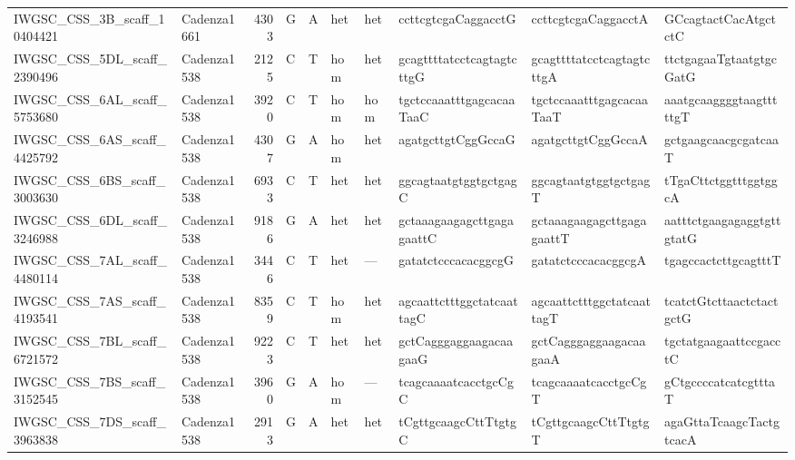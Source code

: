 \begin{longtable}{llrlllllll}
 IWGSC\_CSS\_3B\_scaff\_10404421  & Cadenza1661 &       4303 & G         & A        & het            & het         & ccttcgtcgaCaggacctG       & ccttcgtcgaCaggacctA       & GCcagtactCacAtgctctC      \\
 IWGSC\_CSS\_5DL\_scaff\_2390496  & Cadenza1538 &       2125 & C         & T        & hom            & het         & gcagttttatcctcagtagtcttgG & gcagttttatcctcagtagtcttgA & ttctgagaaTgtaatgtgcGatG   \\
 IWGSC\_CSS\_6AL\_scaff\_5753680  & Cadenza1538 &       3920 & C         & T        & hom            & hom         & tgctccaaatttgagcacaaTaaC  & tgctccaaatttgagcacaaTaaT  & aaatgcaaggggtaagtttttgT   \\
 IWGSC\_CSS\_6AS\_scaff\_4425792  & Cadenza1538 &       4307 & G         & A        & hom            & het         & agatgcttgtCggGccaG        & agatgcttgtCggGccaA        & gctgaagcaacgcgatcaaT      \\
 IWGSC\_CSS\_6BS\_scaff\_3003630  & Cadenza1538 &       6933 & C         & T        & het            & het         & ggcagtaatgtggtgctgagC     & ggcagtaatgtggtgctgagT     & tTgaCttctggtttggtggcA     \\
 IWGSC\_CSS\_6DL\_scaff\_3246988  & Cadenza1538 &       9186 & G         & A        & het            & het         & gctaaagaagagcttgagagaattC & gctaaagaagagcttgagagaattT & aatttctgaagagaggtgttgtatG \\
 IWGSC\_CSS\_7AL\_scaff\_4480114  & Cadenza1538 &       3446 & C         & T        & het            & ---         & gatatctcccacacggcgG       & gatatctcccacacggcgA       & tgagccactcttgcagtttT      \\
 IWGSC\_CSS\_7AS\_scaff\_4193541  & Cadenza1538 &       8359 & C         & T        & hom            & het         & agcaattctttggctatcaattagC & agcaattctttggctatcaattagT & tcatctGtcttaactctactgctG  \\
 IWGSC\_CSS\_7BL\_scaff\_6721572  & Cadenza1538 &       9223 & C         & T        & het            & het         & gctCagggaggaagacaagaaG    & gctCagggaggaagacaagaaA    & tgctatgaagaattccgacctC    \\
 IWGSC\_CSS\_7BS\_scaff\_3152545  & Cadenza1538 &       3960 & G         & A        & hom            & ---         & tcagcaaaatcacctgcCgC      & tcagcaaaatcacctgcCgT      & gCtgccccatcatcgtttaT      \\
 IWGSC\_CSS\_7DS\_scaff\_3963838  & Cadenza1538 &       2913 & G         & A        & het            & het         & tCgttgcaagcCttTtgtgC      & tCgttgcaagcCttTtgtgT      & agaGttaTcaagcTactgtcacA   \\

\end{longtable}
